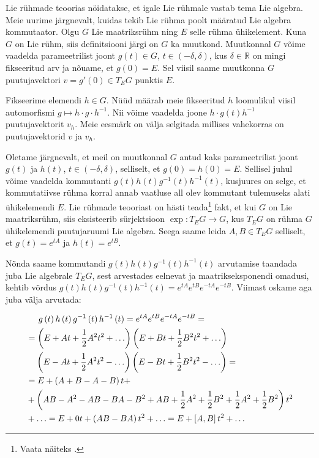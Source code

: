 \documentclass[12pt]{article}
\theoremstyle{plain}
\theoremstyle{definition}
\numberwithin{equation}{section}
\def\R{{\mathbb R}}
\begin{document}
Lie rühmade teoorias nöidatakse, et igale Lie rühmale vastab tema 
Lie algebra. Meie uurime järgnevalt, kuidas tekib Lie rühma poolt 
määratud Lie algebra kommutaator. Olgu $G$ Lie maatriksrühm ning $E$ 
selle rühma ühikelement. Kuna $G$ on Lie rühm, siis definitsiooni 
järgi on $G$ ka muutkond. Muutkonnal $G$ võime vaadelda 
parameetrilist joont 
$g\left(t\right) \in G$, $t \in \left(-\delta, \delta\right)$, kus 
$\delta \in \R$ on mingi fikseeritud arv ja nõuame, et 
$g\left(0\right) = E$. Sel viisil saame muutkonna $G$ puutujavektori 
$v = g'\left(0\right) \in T_E G$ punktis $E$.

Fikseerime elemendi $h \in G$. Nüüd määrab meie fikseeritud $h$ 
loomulikul viisil automorfismi $g \mapsto h \cdot g \cdot h^{-1}$. 
Nii võime vaadelda joone $h \cdot g\left(t\right) h^{-1}$ 
puutujavektorit $v_h$. Meie eesmärk on välja selgitada millises 
vahekorras on puutujavektorid $v$ ja $v_h$.

Oletame järgnevalt, et meil on muutkonnal $G$ antud kaks 
parameetrilist joont $g\left(t\right)$ ja $h\left(t\right)$, 
$t \in \left(-\delta, \delta\right)$, selliselt, et 
$g\left(0\right) = h\left(0\right) = E$. Sellisel juhul võime 
vaadelda kommutanti $g\left(t\right) h\left(t\right) 
g^{-1}\left(t\right) h^{-1}\left(t\right)$, kusjuures on selge, et 
kommutatiivse rühma korral annab vaatluse all olev kommutant 
tulemuseks alati ühikelemendi $E$. Lie rühmade teooriast on hästi 
teada\footnote{Vaata näiteks \cite[Exponential map]{Kirillov}.} fakt, 
et kui $G$ on Lie maatriksrühm, siis eksisteerib sürjektsioon 
$\exp : T_E G \rightarrow G$, kus $T_E G$ on rühma $G$ ühikelemendi 
puutujaruumi Lie algebra. Seega saame leida $A, B \in T_E G$ 
selliselt, et $g\left(t\right) = e^{tA}$ ja $h\left(t\right) = 
e^{tB}$. 

Nõnda saame kommutandi 
$g\left(t\right) h\left(t\right) g^{-1}\left(t\right) 
h^{-1}\left(t\right)$ arvutamise taandada juba Lie algebrale 
$T_E G$, sest arvestades eelnevat ja maatrikseksponendi omadusi, 
kehtib võrdus $g\left(t\right) h\left(t\right) g^{-1}\left(t\right) 
h^{-1}\left(t\right) = e^{tA} e^{tB} e^{-tA} e^{-tB}$. 
Viimast oskame aga juba välja arvutada:

\begin{align*}
&\hphantom{=}\ \ g\left(t\right) h\left(t\right) g^{-1}\left(t\right) 
	h^{-1}\left(t\right) = e^{tA} e^{tB} e^{-tA} e^{-tB} = \\
&= \left(E + At + \frac{1}{2}A^2 t^2 + \ldots \right) 
	\left(E + Bt + \frac{1}{2}B^2 t^2 + \ldots \right) \\
&\hphantom{=}\ \left(E - At + \frac{1}{2}A^2 t^2 - \ldots \right) 
	\left(E - Bt + \frac{1}{2}B^2 t^2 - \ldots \right) = \\
&= E + \left(A + B - A - B\right)t + \\
	&+ \left(AB - A^2 - AB - BA - B^2 + AB + \frac{1}{2} A^2 + 
	\frac{1}{2} B^2 + \frac{1}{2} A^2 + \frac{1}{2} B^2\right)t^2 \\
	&+ \ldots = E + 0t + \left(AB - BA\right)t^2 + \ldots = E + 
	\left[A, B\right]t^2 + \ldots
\end{align*}
\end{document}
